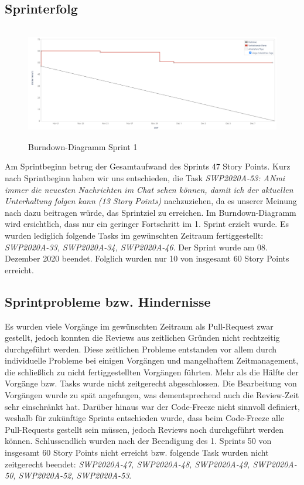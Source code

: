 \documentclass[12pt,a4paper, oneside]{article}
\begin{document}
    \subsection{Sprinterfolg}

    \begin{figure}[h]
        \centering
        \includegraphics[width=\textwidth, height=5cm]{../img/sprint_01/Burndown-Sprint1.PNG}
        \caption{Burndown-Diagramm Sprint 1}
        \label{fig: Burndown-Sprint1}
    \end{figure}

    \noindent
    Am Sprintbeginn betrug der Gesamtaufwand des Sprints 47 Story Points. Kurz nach Sprintbeginn haben wir uns entschieden, die Task \textit{SWP2020A-53: ANmi immer die neuesten Nachrichten im Chat sehen können, damit ich der aktuellen Unterhaltung folgen kann (13 Story Points)} nachzuziehen, da es unserer Meinung nach dazu beitragen würde, das Sprintziel zu erreichen. Im Burndown-Diagramm wird ersichtlich, dass nur ein geringer Fortschritt im 1. Sprint erzielt wurde. Es wurden lediglich folgende Tasks im gewünschten Zeitraum fertiggestellt: \textit{SWP2020A-33, SWP2020A-34, SWP2020A-46}. Der Sprint wurde am 08. Dezember 2020 beendet. Folglich wurden nur 10 von insgesamt 60 Story Points erreicht.

    \subsection{Sprintprobleme bzw. Hindernisse}
    Es wurden viele Vorgänge im gewünschten Zeitraum als Pull-Request zwar gestellt, jedoch konnten die Reviews aus zeitlichen Gründen nicht rechtzeitig durchgeführt werden. Diese zeitlichen Probleme entstanden vor allem durch individuelle Probleme bei einigen Vorgängen und mangelhaftem Zeitmanagement, die schließlich zu nicht fertiggestellten Vorgängen führten. Mehr als die Hälfte der Vorgänge bzw. Tasks wurde nicht zeitgerecht abgeschlossen. Die Bearbeitung von Vorgängen wurde zu spät angefangen, was dementsprechend auch die Review-Zeit sehr einschränkt hat. Darüber hinaus war der Code-Freeze nicht sinnvoll definiert, weshalb für zukünftige Sprints entschieden wurde, dass beim Code-Freeze alle Pull-Requests gestellt sein müssen, jedoch Reviews noch durchgeführt werden können. Schlussendlich wurden nach der Beendigung des 1. Sprints 50 von insgesamt 60 Story Points nicht erreicht bzw. folgende Task wurden nicht zeitgerecht beendet: \textit{SWP2020A-47, SWP2020A-48, SWP2020A-49, SWP2020A-50, SWP2020A-52, SWP2020A-53}.
\end{document}
